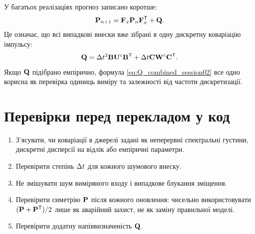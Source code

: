 У багатьох реалізаціях прогноз записано коротше:
\begin{equation}
\mathbf{P}_{n+1}=\mathbf{F}_x\mathbf{P}_n\mathbf{F}_x^{\mathsf{T}}+\mathbf{Q}.
\end{equation}
Це означає, що всі випадкові внески вже зібрані в одну дискретну коваріацію імпульсу:
\begin{equation}\label{eq:Q_combined_session02}
\mathbf{Q}=\Delta t^2\mathbf{B}\mathbf{U}^{c}\mathbf{B}^{\mathsf{T}}
+\Delta t\mathbf{C}\mathbf{W}^{c}\mathbf{C}^{\mathsf{T}}.
\end{equation}
Якщо $\mathbf{Q}$ підібрано емпірично, формула \eqref{eq:Q_combined_session02} все одно корисна як перевірка одиниць виміру та залежності від частоти дискретизації.

\section{Перевірки перед перекладом у код}

\begin{enumerate}[leftmargin=2em]
\item З'ясувати, чи коваріації в джерелі задані як неперервні спектральні густини, дискретні дисперсії на відлік або емпіричні параметри.
\item Перевірити степінь $\Delta t$ для кожного шумового внеску.
\item Не змішувати шум виміряного входу і випадкове блукання зміщення.
\item Перевірити симетрію $\mathbf{P}$ після кожного оновлення: чисельно використовувати $(\mathbf{P}+\mathbf{P}^{\mathsf{T}})/2$ лише як аварійний захист, не як заміну правильної моделі.
\item Перевірити додатну напіввизначеність $\mathbf{Q}$.
\end{enumerate}
